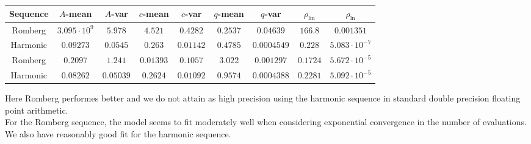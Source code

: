 \begin{table}[H]
    \centering
    \small
    \begin{tabular}{c||c|c|c|c|c|c|c|c}
Sequence & \(A\)-mean & \(A\)-var & \(c\)-mean & \(c\)-var & \(q\)-mean & \(q\)-var & \(\rho_{\operatorname{lin}}\) & \(\rho_{\ln}\)\\\hline
\rowcolor{red}
Romberg & \(3.095\cdot 10^9\) & \(5.978\) & \(4.521\) & \(0.4282\) & \(0.2537\) & \(0.04639\) & \(166.8\) & \(0.001351\) \\
\rowcolor{green}
Harmonic & \(0.09273\) & \(0.0545\) & \(0.263\) & \(0.01142\) & \(0.4785\) & \(0.0004549\) & \(0.228\) & \(5.083\cdot 10^{-7}\) \\
\rowcolor{green}
Romberg & \(0.2097\) & \(1.241\) & \(0.01393\) & \(0.1057\) & \(3.022\) & \(0.001297\) & \(0.1724\) & \(5.672\cdot 10^{-5}\) \\
\rowcolor{green}
Harmonic & \(0.08262\) & \(0.05039\) & \(0.2624\) & \(0.01092\) & \(0.9574\) & \(0.0004388\) & \(0.2281\) & \(5.092\cdot 10^{-5}\) \\
    \end{tabular}
    \label{tab:my_label}
\end{table}

Here Romberg performes better and we do not attain as high precision using the harmonic sequence in standard double precision floating point arithmetic.\\

For the Romberg sequence, the model seems to fit moderately well when considering exponential convergence in the number of evaluations. We also have reasonably good fit for the harmonic sequence.\\

